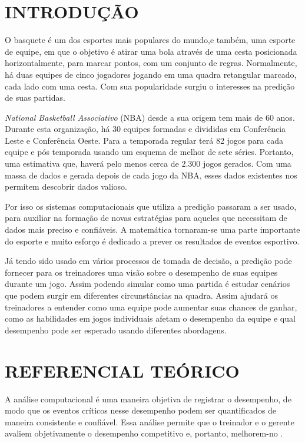 \newpage
\section{INTRODUÇÃO}


O basquete é um dos esportes mais populares do mundo,e também,	 uma esporte de equipe, em que o objetivo é atirar uma bola através de uma cesta posicionada horizontalmente, para marcar pontos, com um conjunto de regras. Normalmente, há duas equipes de cinco jogadores jogando em uma quadra retangular marcado, cada lado com uma cesta. Com sua popularidade surgiu o interesses na predição de suas partidas. 


\textit{National Basketball Associativo} (NBA) desde a sua origem tem mais de 60 anos. Durante esta organização, há 30 equipes formadas e divididas em Conferência Leste e Conferência Oeste. Para a temporada regular terá 82 jogos para cada equipe e pós temporada usando um esquema de melhor de sete séries. Portanto, uma estimativa que, haverá pelo menos cerca de 2.300 jogos gerados. Com uma massa de dados e gerada depois de cada jogo da NBA, esses dados existentes nos permitem descobrir dados valioso.

Por isso os sistemas computacionais que utiliza a predição passaram a ser usado, para auxiliar na formação de novas estratégias para aqueles que necessitam de dados mais preciso e confiáveis. A matemática tornaram-se uma parte importante do esporte e muito esforço é dedicado a prever os resultados de eventos esportivo.

Já tendo sido usado em vários processos de tomada de decisão, a predição pode fornecer para os treinadores uma visão sobre o desempenho de suas equipes durante um jogo. Assim podendo simular como uma partida é estudar cenários que podem surgir em diferentes circunstâncias na quadra. Assim ajudará os treinadores a entender como uma equipe pode aumentar suas chances de ganhar, como as habilidades em jogos individuais afetam o desempenho da equipe e qual desempenho pode ser esperado usando diferentes abordagens.


\section{REFERENCIAL TEÓRICO}
A análise computacional é uma maneira objetiva de registrar o desempenho, de modo que os eventos críticos nesse desempenho podem ser quantificados de maneira consistente e confiável. Essa análise permite que o treinador e o gerente avaliem objetivamente o desempenho competitivo e, portanto, melhorem-no \cite{Taylor2004}. 


